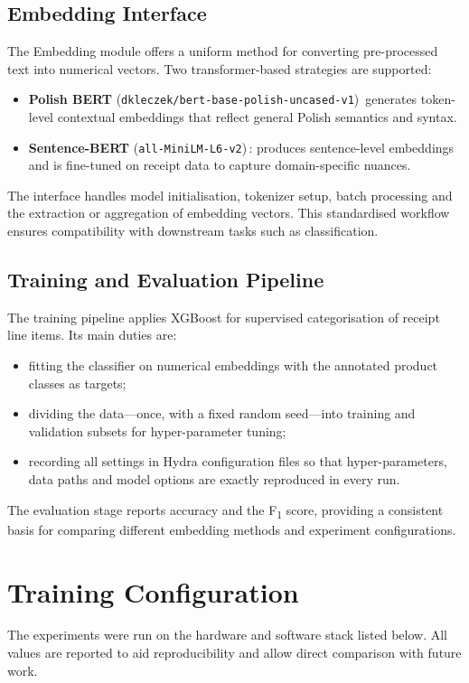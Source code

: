\documentclass{SGGW-thesis-EN}
\begin{document}
\subsection{Embedding Interface}
The Embedding module offers a uniform method for converting pre-processed text into numerical
vectors. Two transformer-based strategies are supported:

\begin{itemize}
  \item \textbf{Polish BERT} (\texttt{dkleczek/bert-base-polish-uncased-v1})\, generates token-level contextual embeddings
        that reflect general Polish semantics and syntax.
  \item \textbf{Sentence-BERT} (\texttt{all-MiniLM-L6-v2})\,: produces sentence-level embeddings and is fine-tuned on
        receipt data to capture domain-specific nuances.
\end{itemize}
\noindent The interface handles model initialisation, tokenizer setup, batch processing and the extraction or aggregation of
embedding vectors. This standardised workflow ensures compatibility with downstream tasks such as classification.


\subsection{Training and Evaluation Pipeline}
The training pipeline applies XGBoost for supervised categorisation of receipt line items. Its main duties are:
\begin{itemize}
  \item fitting the classifier on numerical embeddings with the annotated product classes as targets;
  \item dividing the data—once, with a fixed random seed—into training and validation subsets for hyper-parameter
        tuning;
  \item recording all settings in Hydra configuration files so that hyper-parameters, data paths and model options are
        exactly reproduced in every run.
\end{itemize}

The evaluation stage reports accuracy and the F\textsubscript{1} score, providing a consistent basis for
comparing different embedding methods and experiment configurations.


\section{Training Configuration}
The experiments were run on the hardware and software stack listed below. All values are reported to aid reproducibility
and allow direct comparison with future work.
\end{document}
